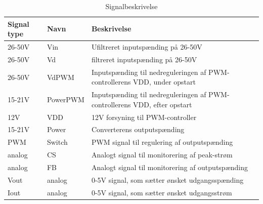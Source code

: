 \begin{table}[htbp]
	\centering
	\begin{tabular}{|l|l|l|}
		\hline
		\textbf{Signal type} 	&\textbf{Navn}		&\textbf{Beskrivelse} \\\hline
		26-50V			&Vin		&Ufiltreret inputspænding på 26-50V\\\hline
		26-50V			&Vd			&filtreret inputspænding på 26-50V\\\hline
		26-50V			&VdPWM			&Inputspænding til nedreguleringen af PWM-controllerens VDD, under opstart\\\hline
		15-21V			&PowerPWM		&Inputspænding til nedreguleringen af PWM-controllerens VDD, efter opstart\\\hline
		12V				&VDD		&12V forsyning til PWM-controller\\\hline
		15-21V			&Power		&Converterens outputspænding\\\hline
		PWM				&Switch		&PWM signal til regulering af outputspænding\\\hline
		analog			&CS			&Analogt signal til monitorering af peak-strøm   \\\hline	
		analog			&FB			&Analogt signal til monitorering af outputspænding\\\hline
		Vout			&analog		&0-5V signal, som sætter ønsket udgangsspænding\\\hline
		Iout			&analog		&0-5V signal, som sætter ønsket udgangsstrøm\\\hline
		
	\end{tabular}
	\caption{Signalbeskrivelse}
	\label{tabel: Signalbeskrivelse}
\end{table}


